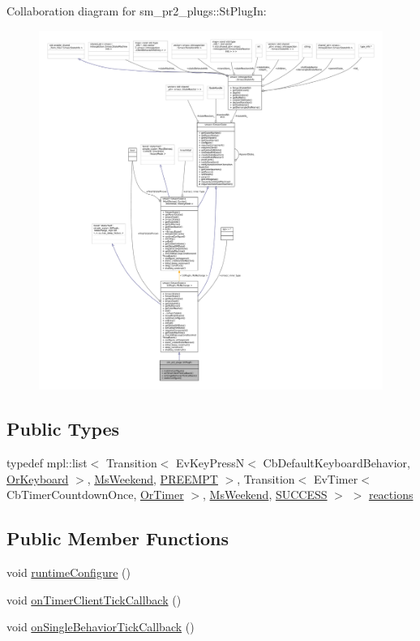Collaboration diagram for sm\+\_\+pr2\+\_\+plugs\+:\+:St\+Plug\+In\+:
\nopagebreak
\begin{figure}[H]
\begin{center}
\leavevmode
\includegraphics[width=350pt]{structsm__pr2__plugs_1_1StPlugIn__coll__graph}
\end{center}
\end{figure}
\subsection*{Public Types}
\begin{DoxyCompactItemize}
\item 
typedef mpl\+::list$<$ Transition$<$ Ev\+Key\+PressN$<$ Cb\+Default\+Keyboard\+Behavior, \hyperlink{classsm__pr2__plugs_1_1OrKeyboard}{Or\+Keyboard} $>$, \hyperlink{classsm__pr2__plugs_1_1MsWeekend}{Ms\+Weekend}, \hyperlink{classPREEMPT}{P\+R\+E\+E\+M\+PT} $>$, Transition$<$ Ev\+Timer$<$ Cb\+Timer\+Countdown\+Once, \hyperlink{classsm__pr2__plugs_1_1OrTimer}{Or\+Timer} $>$, \hyperlink{classsm__pr2__plugs_1_1MsWeekend}{Ms\+Weekend}, \hyperlink{classSUCCESS}{S\+U\+C\+C\+E\+SS} $>$ $>$ \hyperlink{structsm__pr2__plugs_1_1StPlugIn_acadd8973f5532141f02d9ead1a2b173d}{reactions}
\end{DoxyCompactItemize}
\subsection*{Public Member Functions}
\begin{DoxyCompactItemize}
\item 
void \hyperlink{structsm__pr2__plugs_1_1StPlugIn_a21411a3a1c4fa85a7bad312cf01b0d9a}{runtime\+Configure} ()
\item 
void \hyperlink{structsm__pr2__plugs_1_1StPlugIn_a1748462c4026a2df5be52e38a429560b}{on\+Timer\+Client\+Tick\+Callback} ()
\item 
void \hyperlink{structsm__pr2__plugs_1_1StPlugIn_a6206766ae01ea5ee0effe3f574245176}{on\+Single\+Behavior\+Tick\+Callback} ()
\end{DoxyCompactItemize}
